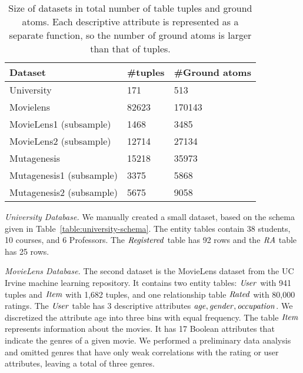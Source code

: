 \documentclass[letterpaper]{article}
\begin{document}
\begin{table}[tbp] \centering
\begin{tabular}[c]
{|l|l|l|}\hline
 \textbf{Dataset} & \textbf{\#tuples} & \textbf{\#Ground atoms} \\\hline
University&171&513\\\hline
Movielens &82623&170143\\\hline
MovieLens1 (subsample)&1468&3485\\\hline
MovieLens2 (subsample)&12714 &27134 \\\hline
Mutagenesis &15218& 35973 \\\hline
Mutagenesis1 (subsample)&3375& 5868 \\\hline
Mutagenesis2 (subsample)&5675&9058 \\\hline
\end{tabular}
\caption{Size of datasets in total number of table tuples and ground atoms. Each descriptive attribute is represented as a separate function, so the number of ground atoms is larger than that of tuples.\label{table:datasetsize}}
\end{table}


{\em University Database.} We manually created a small dataset, based on the schema given in Table~\ref{table:university-schema}. 
The entity tables contain 38 students, 10 courses, and 6  Professors. The $\mathit{Registered}$ table has 92 rows and the $\it{RA}$ table has 25 rows. %

{\em MovieLens Database.} The second dataset is the MovieLens dataset from the UC Irvine machine learning repository. %
It contains two entity tables: $\it{User}$ with 941 tuples and $\it{Item}$ with 1,682 tuples, and one relationship table $\it{Rated}$ with 80,000 ratings. The $\it{User}$ table has %
3 descriptive attributes $\mathit{age}, \it{gender}, \it{occupation}$. We discretized the attribute age into three bins with equal frequency. The table $\it{Item}$ represents information about the movies. It has 17 Boolean attributes that indicate the genres of a given movie. We performed a preliminary data analysis and omitted genres that have only weak correlations with the rating or user attributes, leaving a total of three genres.

\end{document}
